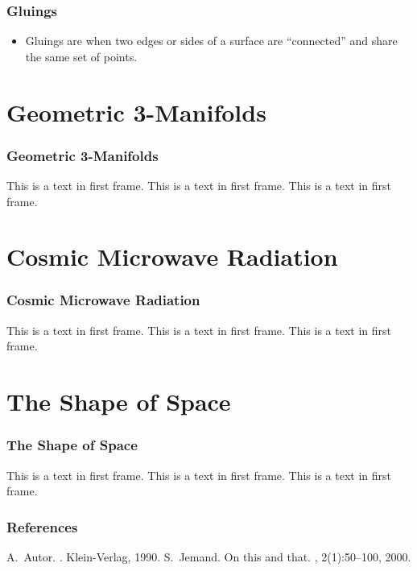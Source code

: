 \documentclass[13pt]{beamer}
\begin{document}
\begin{frame}
\frametitle{Gluings}
	\begin{itemize}
		\item \alert{Gluings} are when two edges or sides of a surface are ``connected'' and share the same set of points.
	\end{itemize}
\end{frame}

\section{Geometric 3-Manifolds} %
\begin{frame}
\frametitle{Geometric 3-Manifolds}
This is a text in first frame. This is a text in first frame. This is a text in first frame.
\end{frame}

\section{Cosmic Microwave Radiation} %
\begin{frame}
\frametitle{Cosmic Microwave Radiation}
This is a text in first frame. This is a text in first frame. This is a text in first frame.
\end{frame}

\section{The Shape of Space} %
\begin{frame}
\frametitle{The Shape of Space}
This is a text in first frame. This is a text in first frame. This is a text in first frame.
\end{frame}

 \begin{frame}[allowframebreaks]
  \frametitle{References}    
  \begin{thebibliography}{10}    
  \beamertemplatebookbibitems
    A.~Autor.
    .
    \newblock Klein-Verlag, 1990.
  \beamertemplatearticlebibitems
    S.~Jemand.
    \newblock On this and that.
    , 2(1):50--100, 2000.
  \end{thebibliography}
\end{frame}
\end{document}

